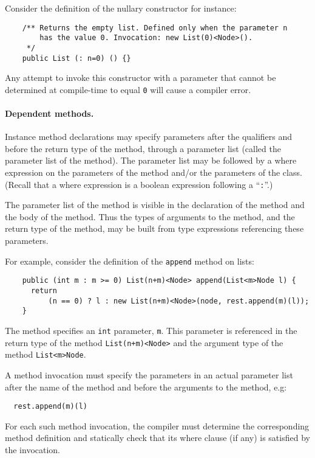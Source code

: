 \documentclass[fullpage]{article}
\begin{document}

Consider the definition of the nullary constructor for instance:
{\footnotesize
\begin{verbatim}
    /** Returns the empty list. Defined only when the parameter n 
        has the value 0. Invocation: new List(0)<Node>().
     */
    public List (: n=0) () {}
\end{verbatim}}

Any attempt to invoke this constructor with a parameter that cannot be
determined at compile-time to equal {\tt 0} will cause a compiler
error.

{}\paragraph{Dependent methods.}  
Instance method declarations may specify parameters after the
qualifiers and before the return type of the method, through a
parameter list (called the parameter list of the method).  The
parameter list may be followed by a where expression on the parameters
of the method and/or the parameters of the class. (Recall that a where
expression is a boolean expression following a ``{\tt :}''.)  

The parameter list of the method is visible in the declaration of the
method and the body of the method. Thus the types of arguments to the
method, and the return type of the method, may be built from type
expressions referencing these parameters.

For example, consider the definition of the {\tt append} method on lists:
{\footnotesize
\begin{verbatim}
    public (int m : m >= 0) List(n+m)<Node> append(List<m>Node l) {
      return 
          (n == 0) ? l : new List(n+m)<Node>(node, rest.append(m)(l));
    }
\end{verbatim}}

The method specifies an {\tt int} parameter, {\tt m}. This parameter
is referenced in the return type of the method {\tt List(n+m)<Node>}
and the argument type of the method {\tt List<m>Node}.

A method invocation must specify the parameters in an actual parameter
list after the name of the method and before the arguments to the
method, e.g:

{\footnotesize
\begin{verbatim}
  rest.append(m)(l)
\end{verbatim}}

For each such method invocation, the compiler must determine the
corresponding method definition and statically check that its where
clause (if any) is satisfied by the invocation.
\end{document}
